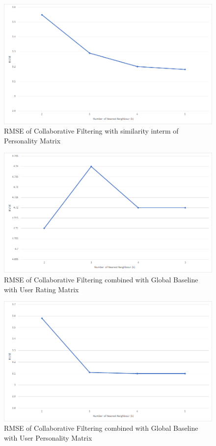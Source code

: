\begin{figure}[!ht]
  \centering
    \includegraphics[width=1\textwidth]{fig/rmse_cf_personality.png}
    \caption{RMSE of Collaborative Filtering with similarity interm of Personality Matrix}
\end{figure}

\begin{figure}[!ht]
  \centering
    \includegraphics[width=1\textwidth]{fig/rmse_cf_global.png}
    \caption{RMSE of Collaborative Filtering combined with Global Baseline with User Rating Matrix}
\end{figure}

\begin{figure}[!ht]
  \centering
    \includegraphics[width=1\textwidth]{fig/rmse_cf_global_personality.png}
    \caption{RMSE of Collaborative Filtering combined with Global Baseline with User Personality Matrix}
\end{figure}

